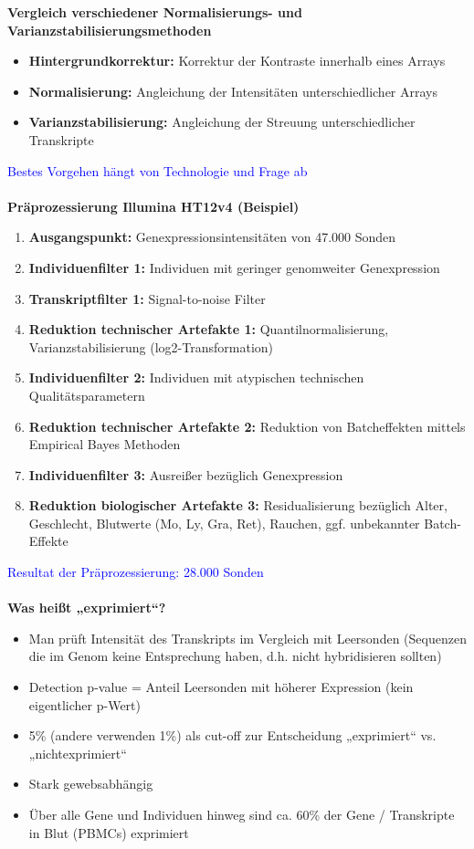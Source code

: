 \newpage
\textbf{Vergleich verschiedener Normalisierungs- und Varianzstabilisierungsmethoden}
\begin{itemize}
	\item \textbf{Hintergrundkorrektur:} Korrektur der Kontraste innerhalb eines Arrays
	\item \textbf{Normalisierung:} Angleichung der Intensitäten unterschiedlicher Arrays
	\item \textbf{Varianzstabilisierung:} Angleichung der Streuung unterschiedlicher Transkripte
\end{itemize}

\textcolor{blue}{Bestes Vorgehen hängt von Technologie und Frage ab}
\\\\
\textbf{Präprozessierung Illumina HT12v4 (Beispiel)}
\begin{enumerate}
	\item \textbf{Ausgangspunkt:} Genexpressionsintensitäten von 47.000 Sonden
	\item \textbf{Individuenfilter 1:} Individuen mit geringer genomweiter Genexpression
	\item \textbf{Transkriptfilter 1:} Signal-to-noise Filter
	\item \textbf{Reduktion technischer Artefakte 1:} Quantilnormalisierung, Varianzstabilisierung (log2-Transformation)
	\item \textbf{Individuenfilter 2:} Individuen mit atypischen technischen Qualitätsparametern
	\item \textbf{Reduktion technischer Artefakte 2:} Reduktion von Batcheffekten mittels Empirical Bayes Methoden
	\item \textbf{Individuenfilter 3:} Ausreißer bezüglich Genexpression
	\item \textbf{Reduktion biologischer Artefakte 3:} Residualisierung bezüglich Alter, Geschlecht, Blutwerte (Mo, Ly, Gra, Ret), Rauchen, ggf. unbekannter Batch-Effekte
\end{enumerate}

\textcolor{blue}{Resultat der Präprozessierung: 28.000 Sonden}
\\\\
\textbf{Was heißt „exprimiert“?}
\begin{itemize}
	\item Man prüft Intensität des Transkripts im Vergleich mit Leersonden (Sequenzen die im Genom keine Entsprechung haben, d.h. nicht hybridisieren sollten)
	\item Detection p-value = Anteil Leersonden mit höherer Expression (kein eigentlicher p-Wert)
	\item 5\% (andere verwenden 1\%) als cut-off zur Entscheidung „exprimiert“ vs. „nichtexprimiert“
	\item Stark gewebsabhängig
	\item Über alle Gene und Individuen hinweg sind ca. 60\% der Gene / Transkripte in Blut (PBMCs) exprimiert
\end{itemize}


